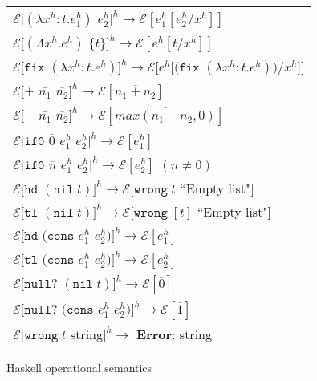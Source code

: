 \begin{figure}[p]
\centering
\begin{tabular}{l}

$\mathscr{E}[(\lambda x^h:t.e^h_1)$ $e^h_2]^h\rightarrow\mathscr{E}[e^h_1[e^h_2/x^h]]$ \\

$\mathscr{E}[(\Lambda x^h.e^h)$ $\lbrace t\rbrace]^h\rightarrow\mathscr{E}[e^h[t/x^h]]$ \\

$\mathscr{E}[\mathtt{fix}$ $(\lambda x^h:t.e^h)]^h\rightarrow\mathscr{E}[e^h[(\mathtt{fix}$ $(\lambda x^h:t.e^h))/x^h]]$ \\

$\mathscr{E}[+$ $\overline{n_1}$ $\overline{n_2}]^h\rightarrow\mathscr{E}[\overline{n_1+n_2}]$ \\

$\mathscr{E}[-$ $\overline{n_1}$ $\overline{n_2}]^h\rightarrow\mathscr{E}[\overline{max(n_1-n_2,0)}]$ \\

$\mathscr{E}[\mathtt{if0}$ $\overline{0}$ $e^h_1$ $e^h_2]^h\rightarrow\mathscr{E}[e^h_1]$ \\

$\mathscr{E}[\mathtt{if0}$ $\overline{n}$ $e^h_1$ $e^h_2]^h\rightarrow\mathscr{E}[e^h_2]$ $(n\neq0)$ \\

$\mathscr{E}[\mathtt{hd}$ $(\mathtt{nil}\;t)]^h\rightarrow\mathscr{E}[\mathtt{wrong}\;t$ ``Empty list"$]$ \\

$\mathscr{E}[\mathtt{tl}$ $(\mathtt{nil}\;t)]^h\rightarrow\mathscr{E}[\mathtt{wrong}\;[t]$ ``Empty list"$]$ \\

$\mathscr{E}[\mathtt{hd}$ $(\mathtt{cons}$ $e^h_1$ $e^h_2)]^h\rightarrow\mathscr{E}[e^h_1]$ \\

$\mathscr{E}[\mathtt{tl}$ $(\mathtt{cons}$ $e^h_1$ $e^h_2)]^h\rightarrow\mathscr{E}[e^h_2]$ \\

$\mathscr{E}[\mathtt{null?}$ $(\mathtt{nil}\;t)]^h\rightarrow\mathscr{E}[\overline{0}]$ \\

$\mathscr{E}[\mathtt{null?}$ $(\mathtt{cons}$ $e^h_1$ $e^h_2)]^h\rightarrow\mathscr{E}[\overline{1}]$ \\

$\mathscr{E}[\mathtt{wrong}\;t$ string$]^h\rightarrow$ \textbf{Error}: string

\end{tabular}
\caption{Haskell operational semantics}
\label{hos}
\end{figure}